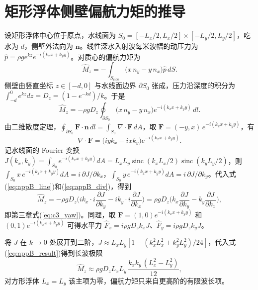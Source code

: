 \chapter{矩形浮体侧壁偏航力矩的推导}
\label{app:yaw}

设矩形浮体中心位于原点，水线面为 $S_0=[-L_x/2,L_x/2]\times[-L_y/2,L_y/2]$，吃水为 $d$，侧壁外法向为 $\mathbf n$。线性深水入射波每米波幅的动压力为 $\hat p=\rho ge^{kz}e^{-i(k_xx+k_yy)}$。对质心的偏航力矩为
\begin{equation}
\hat M_z=-\int_{S_{\mathrm{side}}}\big(x\,n_y-y\,n_x\big)\hat p\,dS.
\label{eq:appB_Mz}
\end{equation}
侧壁由竖直坐标 $z\in[-d,0]$ 与水线面边界 $\partial S_0$ 张成，压力沿深度的积分为 $\int_{-d}^0e^{kz}dz=D_z=(1-e^{-kd})/k$。于是
\begin{equation}
\hat M_z=-\rho gD_z\oint_{\partial S_0}\big(x\,n_y-y\,n_x\big)e^{-i(k_xx+k_yy)}\,dl.
\label{eq:appB_line}
\end{equation}
由二维散度定理，$\oint_{\partial S_0}\mathbf F\cdot\mathbf n\,dl=\int_{S_0}\nabla\cdot\mathbf F\,dA$，取 $\mathbf F=(-y,x)\,e^{-i(k_xx+k_yy)}$，有
\begin{equation}
\nabla\cdot\mathbf F=\big(iyk_x-ixk_y\big)e^{-i(k_xx+k_yy)}.
\label{eq:appB_div}
\end{equation}
记水线面的 Fourier 变换 $J(k_x,k_y)=\int_{S_0}e^{-i(k_xx+k_yy)}dA=L_xL_y\operatorname{sinc}(k_xL_x/2)\operatorname{sinc}(k_yL_y/2)$，则 $\int_{S_0}x\,e^{-i(k_xx+k_yy)}dA=i\,\partial J/\partial k_x$，$\int_{S_0}y\,e^{-i(k_xx+k_yy)}dA=i\,\partial J/\partial k_y$。代入式(\ref{eq:appB_line})和(\ref{eq:appB_div})，得到
\begin{equation}
\hat M_z=-\rho gD_z\Big(ik_x\cdot i\frac{\partial J}{\partial k_y}-ik_y\cdot i\frac{\partial J}{\partial k_x}\Big)
=\rho gD_z\Big(k_x\frac{\partial J}{\partial k_y}-k_y\frac{\partial J}{\partial k_x}\Big),
\label{eq:appB_result}
\end{equation}
即第三章式(\ref{eq:c3_yaw})。同理，取 $\mathbf F=(1,0)e^{-i(k_xx+k_yy)}$ 和 $(0,1)e^{-i(k_xx+k_yy)}$ 可得水平力 $\hat F_x=i\rho gD_zk_xJ$、$\hat F_y=i\rho gD_zk_yJ$。

将 $J$ 在 $k\to0$ 处展开到二阶，$J\approx L_xL_y[1-(k_x^2L_x^2+k_y^2L_y^2)/24]$，代入式(\ref{eq:appB_result})得到长波极限
\begin{equation}
\hat M_z\approx\rho gD_zL_xL_y\,\frac{k_xk_y\,(L_x^2-L_y^2)}{12},
\label{eq:appB_long}
\end{equation}
对方形浮体 $L_x=L_y$ 该主项为零，偏航力矩只来自更高阶的有限波长项。
